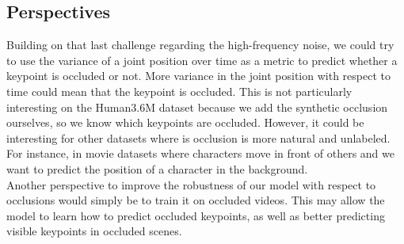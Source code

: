 \documentclass[runningheads]{llncs}
\begin{document}
\subsection{Perspectives}
Building on that last challenge regarding the high-frequency noise, we could try to use the variance of a joint position over time as a metric to predict whether a keypoint is occluded or not. More variance in the joint position with respect to time could mean that the keypoint is occluded. This is not particularly interesting on the Human3.6M dataset because we add the synthetic occlusion ourselves, so we know which keypoints are occluded. However, it could be interesting for other datasets where is occlusion is more natural and unlabeled. For instance, in movie datasets where characters move in front of others and we want to predict the position of a character in the background. \\
Another perspective to improve the robustness of our model with respect to occlusions would simply be to train it on occluded videos. This may allow the model to learn how to predict occluded keypoints, as well as better predicting visible keypoints in occluded scenes.
\end{document}
